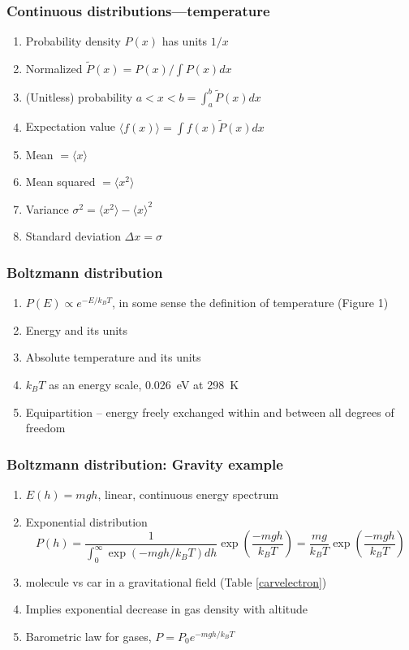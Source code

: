 \documentclass[11pt]{article}
\begin{document}
\subsubsection{Continuous distributions---temperature}
\label{sec:orgac480d5}
\begin{enumerate}
\item Probability density \(P(x)\) has units \(1/x\)
\item Normalized \(\tilde P(x) = P(x)/\int P(x) dx\)
\item (Unitless) probability \(a < x < b = \int_a^b \tilde P(x) dx\)
\item Expectation value \(\langle f(x) \rangle = \int f(x) \tilde P(x) dx\)
\item Mean \(= \langle x \rangle\)
\item Mean squared \(= \langle x^2 \rangle\)
\item Variance \(\sigma^2=\langle x^2 \rangle - \langle x \rangle^2\)
\item Standard deviation \(\Delta x = \sigma\)
\end{enumerate}

\subsubsection{Boltzmann distribution}
\label{sec:org41eaf51}
\begin{enumerate}
\item \(P(E) \propto e^{-E/k_BT}\), in some sense the definition of temperature (Figure 1)
\item Energy and its units
\item Absolute temperature and its units
\item \(k_BT\) as an energy scale, \SI{0.026}{eV} at \SI{298}{K}
\item Equipartition -- energy freely exchanged within and between all degrees of freedom
\end{enumerate}
\subsubsection{Boltzmann distribution: Gravity example}
\label{sec:org5f41d94}
\begin{enumerate}
\item \(E(h)=mgh\), linear, continuous energy spectrum
\item Exponential distribution
\[P(h) = \frac{1}{\int_0^\infty \exp\left(-mgh/k_BT\right)dh }\exp\left(\frac{-mgh}{k_BT}\right )  =  \frac{mg}{k_BT}\exp\left(\frac{-mgh}{k_BT}\right)\]
\item molecule vs car in a gravitational field (Table \ref{carvelectron})
\item Implies exponential decrease in gas density with altitude
\item Barometric law for gases, \(P=P_0e^{-mgh/k_BT}\)
\end{enumerate}
\end{document}
